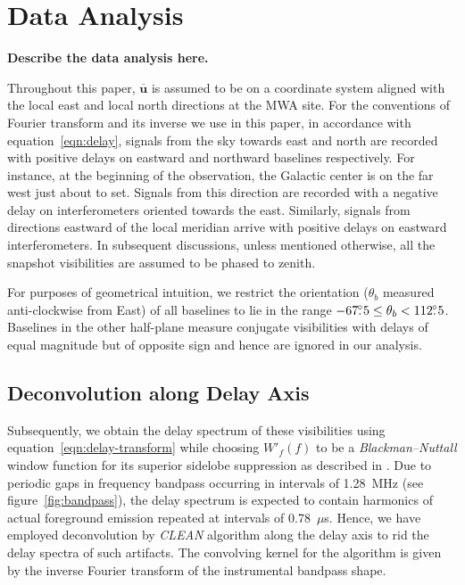 \documentclass[preprint2,iop,numberedappendix]{emulateapj}
\begin{document}
\section{Data Analysis}\label{sec:data-analysis}

{\bf Describe the data analysis here.}

Throughout this paper, $\overline{\mathbf{u}}$ is assumed to be on a coordinate system aligned with the local east and local north directions at the MWA site. For the conventions of Fourier transform and its inverse we use in this paper, in accordance with equation~\ref{eqn:delay}, signals from the sky towards east and north are recorded with positive delays on eastward and northward baselines respectively. For instance, at the beginning of the observation, the Galactic center is on the far west just about to set. Signals from this direction are recorded with a negative delay on interferometers oriented towards the east. Similarly, signals from directions eastward of the local meridian arrive with positive delays on eastward interferometers. In subsequent discussions, unless mentioned otherwise, all the snapshot visibilities are assumed to be phased to zenith. 

For purposes of geometrical intuition, we restrict the orientation ($\theta_b$ measured anti-clockwise from East) of all baselines to lie in the range $-67\mbox{$.\!\!^\circ$} 5 \leq \theta_b < 112\mbox{$.\!\!^\circ$} 5$. Baselines in the other half-plane measure conjugate visibilities with delays of equal magnitude but of opposite sign and hence are ignored in our analysis.

\subsection{Deconvolution along Delay Axis}\label{sec:CLEAN}

Subsequently, we obtain the delay spectrum of these visibilities using equation~\ref{eqn:delay-transform} while choosing $W'_f(f)$ to be a {\it Blackman--Nuttall} window function for its superior sidelobe suppression as described in \citet{thy13}. Due to periodic gaps in frequency bandpass occurring in intervals of 1.28~MHz (see figure~\ref{fig:bandpass}), the delay spectrum is expected to contain harmonics of actual foreground emission repeated at intervals of 0.78~$\mu$s. Hence, we have employed deconvolution by {\it CLEAN} algorithm \citep{tay99} along the delay axis \citep{par09,par12} to rid the delay spectra of such artifacts. The convolving kernel for the algorithm is given by the inverse Fourier transform of the instrumental bandpass shape. 
\end{document}
